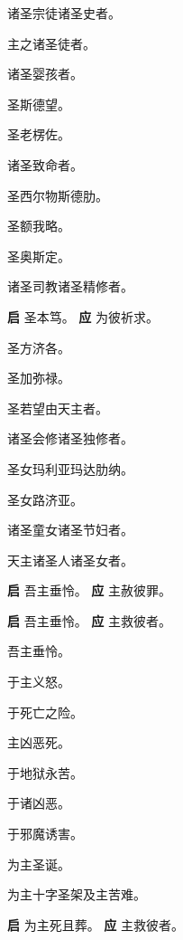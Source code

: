 \documentclass[UTF8,17pt]{ctexart}
\begin{document}
 诸圣宗徒诸圣史者。

 主之诸圣徒者。

 诸圣婴孩者。

 圣斯德望。

 圣⽼楞佐。

 诸圣致命者。

 圣西尔物斯德肋。

 圣额我略。

 圣奥斯定。

 诸圣司教诸圣精修者。

\textbf{启} \quad 圣本笃。 \hfill \textbf{应} \quad 为彼祈求。

 圣⽅济各。

 圣加弥禄。

 圣若望由天主者。

 诸圣会修诸圣独修者。

 圣⼥玛利亚玛达肋纳。

 圣⼥路济亚。

 诸圣童⼥诸圣节妇者。

 天主诸圣⼈诸圣⼥者。

\textbf{启} \quad 吾主垂怜。 \hfill \textbf{应} \quad 主赦彼罪。

\textbf{启} \quad 吾主垂怜。 \hfill \textbf{应} \quad 主救彼者。

 吾主垂怜。

 于主义怒。

 于死亡之险。

 主凶恶死。

 于地狱永苦。

 于诸凶恶。

 于邪魔诱害。

 为主圣诞。

 为主⼗字圣架及主苦难。

\textbf{启} \quad 为主死且葬。 \hfill \textbf{应} \quad 主救彼者。
\end{document}
